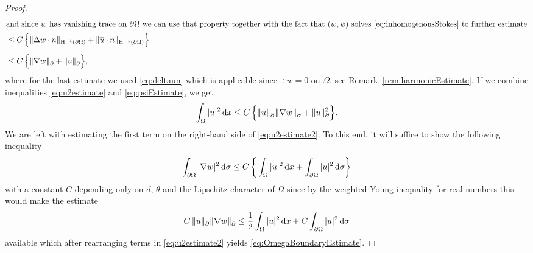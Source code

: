 \begin{proof}
\begin{align}
    \intertext{and since $w$ has vanishing trace on $\partial\Omega$ we can use that property together with the fact that  $(w,\psi)$ solves \eqref{eq:inhomogenousStokes} to further estimate}
    &\leq C \, \Big\{ \| \Delta w \cdot n \|_{\mathrm{H}^{-1}(\partial\Omega)} + \| \overline u \cdot n \|_{\mathrm{H}^{-1}(\partial\Omega)} \Big\} \nonumber\\[0.5em]
    &\leq C \, \Big\{ \|  \nabla w\|^{}_\partial + \|u\|^{}_\partial  \Big\}, \label{eq:psiEstimate}
  \end{align}
  where for the last estimate we used \eqref{eq:deltaun} which is applicable since $\div w = 0$ on $\Omega$, see Remark~\ref{rem:harmonicEstimate}.
  If we combine inequalities \eqref{eq:u2estimate} and \eqref{eq:psiEstimate}, we get
  \begin{align}
    \int_\Omega |u|^2 \, {\operatorname{d}\!{x}} \leq C \, \Big\{ \|u\|^{}_\partial \|\nabla w \|^{}_\partial + \|u\|_\partial^2\Big\}. \label{eq:u2estimate2}
  \end{align}
  We are left with estimating the first term on the right-hand side of \eqref{eq:u2estimate2}.
  To this end, it will suffice to show the following inequality
  \begin{align}
    \label{eq:w2estimate}
    \int_{\partial\Omega} |\nabla w|^2 \, {\operatorname{d}\!{\sigma}} \leq C \, \bigg\{ \int_\Omega |u|^2 \, {\operatorname{d}\!{x}} + \int_{\partial\Omega} |u|^2 \, {\operatorname{d}\!{\sigma}} \bigg\}
  \end{align}
  with a constant $C$ depending only on $d$, $\theta$ and the Lipschitz character of $\Omega$ since by the weighted Young inequality for real numbers this would make the estimate
  \begin{align*}
    C \, \| u\|^{}_\partial \|\nabla w\|^{}_\partial \leq \frac{1}{2} \int_\Omega |u|^2 \, {\operatorname{d}\!{x}} + C \int_{\partial\Omega} |u|^2 \, {\operatorname{d}\!{\sigma}}
  \end{align*}
  available which after rearranging terms in \eqref{eq:u2estimate2} yields \eqref{eq:OmegaBoundaryEstimate}.


\end{proof}
